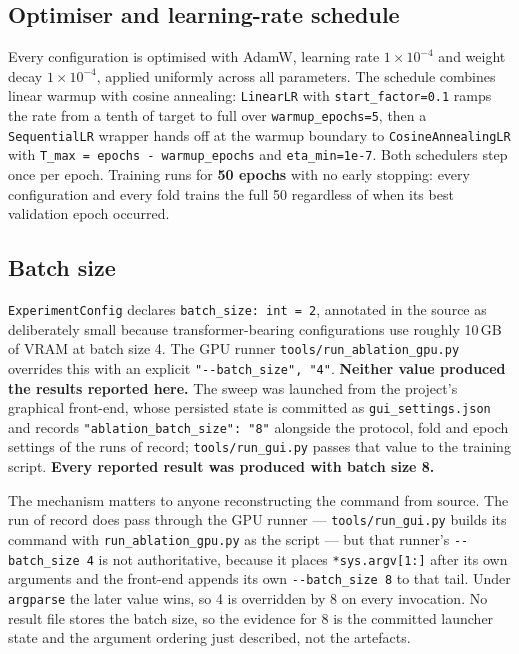 \subsection{Optimiser and learning-rate schedule}
\label{sec:optimiser-config}

Every configuration is optimised with AdamW, learning rate $1\times10^{-4}$ and weight decay $1\times10^{-4}$, applied uniformly across all parameters. The schedule combines linear warmup with cosine annealing: \texttt{LinearLR} with \texttt{start\_factor=0.1} ramps the rate from a tenth of target to full over \texttt{warmup\_epochs=5}, then a \texttt{SequentialLR} wrapper hands off at the warmup boundary to \texttt{CosineAnnealingLR} with \texttt{T\_max = epochs - warmup\_epochs} and \texttt{eta\_min=1e-7}. Both schedulers step once per epoch. Training runs for \textbf{50 epochs} with no early stopping: every configuration and every fold trains the full 50 regardless of when its best validation epoch occurred.

\subsection{Batch size}
\label{sec:batch-size}

\texttt{ExperimentConfig} declares \texttt{batch\_size: int = 2}, annotated in the source as deliberately small because transformer-bearing configurations use roughly 10\,GB of VRAM at batch size 4. The GPU runner \texttt{tools/run\_ablation\_gpu.py} overrides this with an explicit \verb|"--batch_size", "4"|. \textbf{Neither value produced the results reported here.} The sweep was launched from the project's graphical front-end, whose persisted state is committed as \texttt{gui\_settings.json} and records \verb|"ablation_batch_size": "8"| alongside the protocol, fold and epoch settings of the runs of record; \texttt{tools/run\_gui.py} passes that value to the training script. \textbf{Every reported result was produced with batch size 8.}

The mechanism matters to anyone reconstructing the command from source. The run of record does pass through the GPU runner --- \texttt{tools/run\_gui.py} builds its command with \texttt{run\_ablation\_gpu.py} as the script --- but that runner's \texttt{-{}-batch\_size 4} is not authoritative, because it places \verb|*sys.argv[1:]| after its own arguments and the front-end appends its own \texttt{-{}-batch\_size 8} to that tail. Under \texttt{argparse} the later value wins, so 4 is overridden by 8 on every invocation. No result file stores the batch size, so the evidence for 8 is the committed launcher state and the argument ordering just described, not the artefacts.

